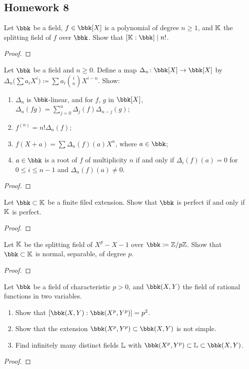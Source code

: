\subsection{Homework 8}
\begin{problem}
  Let $\bbk$ be a field, $f\in\bbk[X]$ is a polynomial of degree $n\geq 1$,
  and $\mathbb{K}$ the splitting field of $f$ over $\bbk$. Show that
  $[\bbK:\bbk]\mid n!$.
\end{problem}
\begin{proof}
\end{proof}

\begin{problem}
  Let $\bbk$ be a field and $n\geq 0$. Define a map
  $\Delta_n\colon \bbk[X]\to\bbk[X]$ by
  $\Delta_n\bigl(\sum a_iX^i\bigr)\coloneq\sum
  a_i\binom{i}{n}X^{i-n}$. Show:
\begin{enumerate}[label=(\alph*),noitemsep]
\item $\Delta_n$ is $\bbk$-linear, and for $f$, $g$ in $\bbk[X]$,
  $\Delta_n(fg)=\sum_{j=0}^n\Delta_j(f)\Delta_{n-j}(g)$;
\item $f^{(n)}=n!\Delta_n(f)$;
\item $f(X+a)=\sum\Delta_n(f)(a)X^n$, where $a\in\bbk$;
\item $a\in\bbk$ is a root of $f$ of multiplicity $n$ if and only if
  $\Delta_i(f)(a)=0$ for $0\leq i\leq n-1$ and $\Delta_n(f)(a)\neq 0$.
\end{enumerate}
\end{problem}
\begin{proof}
\end{proof}

\begin{problem}
  Let $\bbk\subset\bbK$ be a finite filed extension. Show that $\bbk$ is
  perfect if and only if $\mathbb{K}$ is perfect.
\end{problem}
\begin{proof}
\end{proof}

\begin{problem}
  Let $\mathbb{K}$ be the splitting field of $X^p-X-1$ over
  $\bbk\coloneq\bbZ/p\bbZ$. Show that $\bbk\subset\bbK$ is normal,
  separable, of degree $p$.
\end{problem}
\begin{proof}
\end{proof}

\begin{problem}
  Let $\bbk$ be a field of characteristic $p>0$, and $\bbk(X,Y)$ the field
  of rational functions in two variables.
\begin{enumerate}[label=(\alph*),noitemsep]
\item Show that $\left[\bbk(X,Y):\bbk(X^p,Y^p)\right]=p^2$.
\item Show that the extension $\bbk(X^p,Y^p)\subset\bbk(X,Y)$ is not
  simple.
\item Find infinitely many distinct fields $\mathbb{L}$ with
  $\bbk(X^p,Y^p)\subset\bbL\subset\bbk(X,Y)$.
\end{enumerate}
\end{problem}
\begin{proof}
\end{proof}

